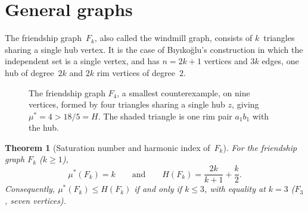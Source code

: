 \documentclass[11pt]{article}
\newtheorem{theorem}{Theorem}
\theoremstyle{definition}
\theoremstyle{remark}
\newcommand{\mustar}{\mu^{*}}
\begin{document}
\section{General graphs}\label{sec:general}

The friendship graph~$F_k$, also called the windmill graph, consists of
$k$~triangles sharing a single hub vertex.  It is the case of
B\i y\i ko\u{g}lu's construction in which the independent set is a single
vertex, and has $n = 2k+1$ vertices and $3k$ edges, one hub of degree~$2k$
and $2k$ rim vertices of degree~$2$.

\begin{figure}[ht]
\centering
{}
\caption{The friendship graph $F_4$, a smallest counterexample, on nine
vertices, formed by four triangles sharing a single hub $z$, giving
$\mustar = 4 > 18/5 = H$.  The shaded triangle is one rim pair $a_1 b_1$ with
the hub.}
\label{fig:friendship}
\end{figure}

\begin{theorem}[Saturation number and harmonic index of~$F_k$]\label{thm:Fk}
For the friendship graph $F_k$ ($k \ge 1$),
\[
  \mustar(F_k) = k
  \qquad\text{and}\qquad
  H(F_k) = \frac{2k}{k+1} + \frac{k}{2}.
\]
Consequently, $\mustar(F_k) \le H(F_k)$ if and only if $k \le 3$, with
equality at $k = 3$ ($F_3$, seven vertices).
\end{theorem}
\end{document}
